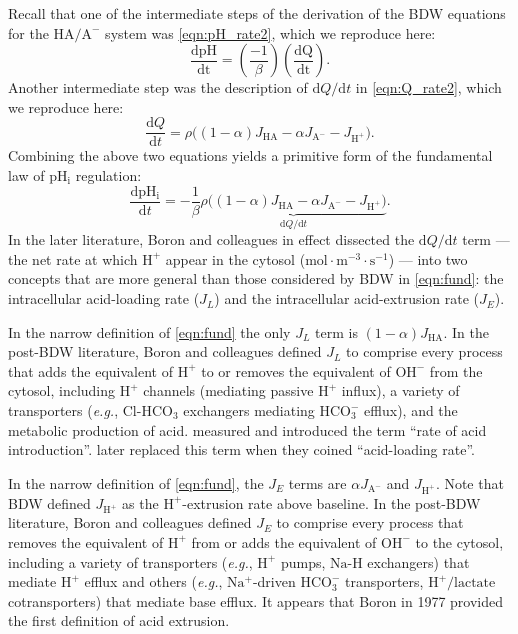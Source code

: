 \documentclass[fleqn,10pt]{physiome}
\begin{document}
Recall that one of the intermediate steps of the derivation of the BDW equations for the $\mathrm{HA}/\mathrm{A^-}$ system was \autoref{eqn:pH_rate2}, which we reproduce here:
\begin{equation}
\dfrac{\mathrm{dpH}}{\mathrm{dt}} = \left(\dfrac{-1}{\beta}\right)\left(\dfrac{\mathrm{dQ}}{\mathrm{dt}}\right). 
\end{equation}
Another intermediate step was the description of $\mathrm{d}Q/\mathrm{d}t$ in \autoref{eqn:Q_rate2}, which we reproduce here:
\begin{equation}
\dfrac{\mathrm{d}Q}{\mathrm{d}t}=\rho\Big( (1-\alpha)J_\mathrm{HA}-\alpha J_{\mathrm{A^-}}-J_\mathrm{H^+} \Big).
\end{equation}
Combining the above two equations yields a primitive form of the fundamental law of $\mathrm{pH_i}$ regulation:
\begin{equation}
\dfrac{\mathrm{dpH_i}}{\mathrm{d}t}=-\dfrac{1}{\beta}\underbrace{\rho \Big( {(1-\alpha)J_\mathrm{HA}}-{\alpha J_\mathrm{A^-}-J_\mathrm{H^+}} \Big) }_{{\mathrm{d}Q}/{\mathrm{d}t}}.
\label{eqn:fund}
\end{equation}
In the later literature, Boron and colleagues in effect dissected the $\mathrm{d}Q/\mathrm{d}t$ term --- the net rate at which $\mathrm{H^+}$ appear in the cytosol ($\mathrm{mol\cdot m^{-3}\cdot s^{-1}}$) --- into two concepts that are more general than those considered by BDW in \autoref{eqn:fund}: the intracellular acid-loading rate ($J_L$) and the intracellular acid-extrusion rate ($J_E$).

In the narrow definition of \autoref{eqn:fund} the only $J_L$ term is $(1-\alpha)J_\mathrm{HA}$. In the post-BDW literature, Boron and colleagues defined $J_L$ to comprise every process that adds the equivalent of $\mathrm{H^+}$ to or removes the equivalent of $\mathrm{OH^-}$ from the cytosol, including $\mathrm{H^+}$ channels (mediating passive $\mathrm{H^+}$ influx), a variety of transporters (\emph{e.g.}, $\mathrm{Cl}$-$\mathrm{HCO_3}$ exchangers mediating $\mathrm{HCO_3^-}$ efflux), and the metabolic production of acid. \cite{boron1979ph} measured and introduced the term ``rate of acid introduction''. \cite{roos1981intracellular} later replaced this term when they coined ``acid-loading rate''.

In the narrow definition of \autoref{eqn:fund}, the $J_E$ terms are $\alpha J_\mathrm{A^-}$ and $J_\mathrm{H^+}$. Note that BDW defined $J_\mathrm{H^+}$ as the $\mathrm{H^+}$-extrusion rate above baseline. In the post-BDW literature, Boron and colleagues defined $J_E$ to comprise every process that removes the equivalent of $\mathrm{H^+}$ from or adds the equivalent of $\mathrm{OH^-}$ to the cytosol, including a variety of transporters (\emph{e.g.}, $\mathrm{H^+}$ pumps, $\mathrm{Na}$-$\mathrm{H}$ exchangers) that mediate $\mathrm{H^+}$ efflux and others (\emph{e.g.}, $\mathrm{Na^+}$-driven $\mathrm{HCO_3^-}$ transporters, $\mathrm{H^+}/\mathrm{lactate}$ cotransporters) that mediate base efflux. It appears that Boron in 1977 provided the first definition of acid extrusion.
\end{document}
